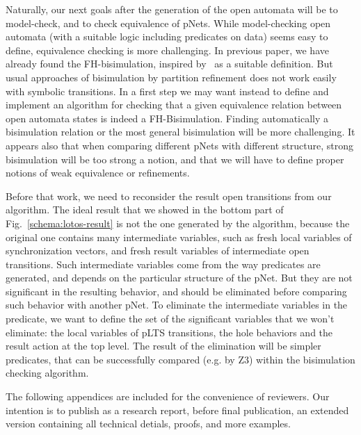 \documentclass{lncs/llncs}
\begin{document}
Naturally, our next goals after the generation of the open automata
will be to model-check, and to check equivalence of  pNets. While
model-checking open automata (with a suitable logic including
predicates on data) seems easy to define, equivalence checking is more challenging.
In previous paper, we
have already found the FH-bisimulation, inspired by~\cite{deSimone85} as a
suitable definition. But usual approaches of bisimulation by partition
refinement does not work easily with symbolic transitions. In a first
step we may want instead to define and implement an algorithm for
checking that a given equivalence relation between open automata 
states is indeed a FH-Bisimulation. Finding automatically a
bisimulation relation or the most general bisimulation will be more
challenging. It appears also that when comparing different pNets with
different structure, strong bisimulation will be too strong a notion,
and that we will have to define proper notions of weak equivalence or
refinements. 

Before that work, we need to reconsider the result open transitions
from our algorithm. The ideal
result that we showed in the bottom part of
Fig.~\ref{schema:lotos-result} is not the one generated by the algorithm,
because the original one contains many intermediate
variables, such as fresh local variables of synchronization
vectors, and fresh result variables of intermediate open transitions.
Such intermediate variables come from the way predicates are
generated, and depends on the particular structure of the pNet. But
they are not significant in the resulting behavior, and should be
eliminated before comparing such behavior with another pNet.
To eliminate the intermediate variables in the predicate, we want to define
the set of the significant variables that we won't eliminate: the
local variables of pLTS transitions, the hole behaviors and the result
action at the top level.
The result of the elimination will be simpler predicates, that can be
successfully compared (e.g. by Z3) within the bisimulation checking
algorithm.





% 


\newpage
\appendix
The following appendices are included for the convenience of reviewers.
Our intention is to publish as a research report, before final publication, an
extended version containing all technical detials, proofs, and more examples.
\end{document}
